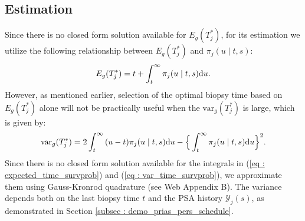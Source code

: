
\subsection{Estimation}
\label{subsec : estimation}
Since there is no closed form solution available for $E_g(T^*_j)$, for its estimation we utilize the following relationship between $E_g(T^*_j)$ and $\pi_j(u \mid t, s)$:
\begin{equation}
\label{eq : expected_time_survprob}
E_g(T^*_j) = t + \int_t^\infty \pi_j(u \mid t, s) \rmn{d} u.
\end{equation}
However, as mentioned earlier, selection of the optimal biopsy time based on $E_g(T_j^*)$ alone will not be practically useful when the $\mbox{var}_g(T^*_j)$ is large, which is given by:
\begin{equation}
\label{eq : var_time_survprob}
\mbox{var}_g(T^*_j) = 2 \int_t^\infty {(u-t) \pi_j(u \mid t, s) \rmn{d} u} - \Big\{\int_t^\infty \pi_j(u \mid t, s) \rmn{d} u\Big\}^2.
\end{equation}
Since there is no closed form solution available for the integrals in (\ref{eq : expected_time_survprob}) and (\ref{eq : var_time_survprob}), we approximate them using Gauss-Kronrod quadrature (see Web Appendix B). The variance depends both on the last biopsy time $t$ and the PSA history $\mathcal{Y}_j(s)$, as demonstrated in Section \ref{subsec : demo_prias_pers_schedule}.


